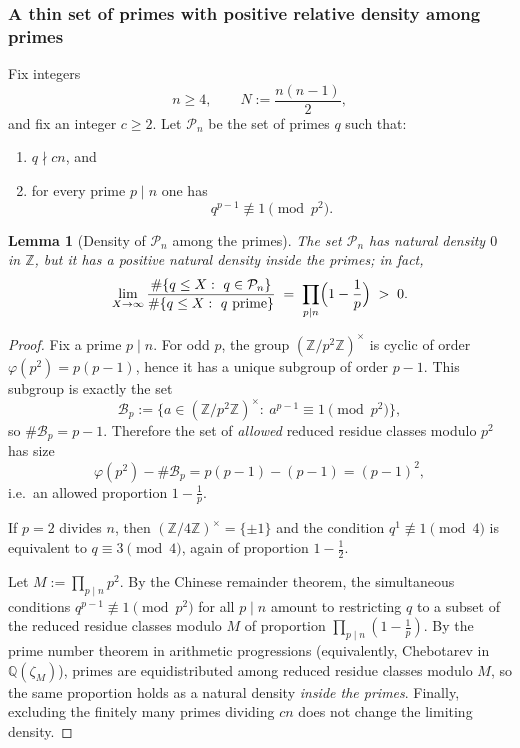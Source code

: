 \documentclass[11pt,letterpaper]{amsart}
\newcommand{\Z}{\mathbb{Z}}
\newcommand{\Q}{\mathbb{Q}}
\theoremstyle{plain}
\newtheorem{lemma}[theorem]{Lemma}
\theoremstyle{definition}
\theoremstyle{remark}
\theoremstyle{plain}
\begin{document}
\subsubsection{A thin set of primes with positive relative density among primes}

Fix integers
\[
n\ge 4,\qquad N:=\frac{n(n-1)}2,
\]
and fix an integer $c\ge 2$.
Let $\mathcal P_n$ be the set of primes $q$ such that:
\begin{enumerate}[label=\textup{(\roman*)}]
\item $q\nmid cn$, and
\item for every prime $p\mid n$ one has
\begin{equation}\label{eq:wieferich-avoid}
q^{p-1}\not\equiv 1\pmod{p^2}.
\end{equation}
\end{enumerate}

\begin{lemma}[Density of $\mathcal P_n$ among the primes]
\label{lem:density-Pm}
The set $\mathcal P_n$ has natural density $0$ in $\Z$, but it has a positive natural density inside the primes; in fact,
\[
\lim_{X\to\infty}\frac{\#\{q\le X:\ q\in\mathcal P_n\}}{\#\{q\le X:\ q\ \text{prime}\}}
\;=\;
\prod_{p\mid n}\Bigl(1-\frac1p\Bigr)
\;>\;0.
\]
\end{lemma}

\begin{proof}
Fix a prime $p\mid n$.  For odd $p$, the group $(\Z/p^2\Z)^\times$ is cyclic of order $\varphi(p^2)=p(p-1)$,
hence it has a unique subgroup of order $p-1$.
This subgroup is exactly the set
\[
\mathcal B_p:=\{a\in (\Z/p^2\Z)^\times:\ a^{p-1}\equiv 1\pmod{p^2}\},
\]
so $\#\mathcal B_p=p-1$. Therefore the set of \emph{allowed} reduced residue classes modulo $p^2$ has size
\[
\varphi(p^2)-\#\mathcal B_p=p(p-1)-(p-1)=(p-1)^2,
\]
i.e.\ an allowed proportion $1-\frac1p$.

If $p=2$ divides $n$, then $(\Z/4\Z)^\times=\{\pm1\}$ and the condition $q^{1}\not\equiv 1\pmod4$
is equivalent to $q\equiv 3\pmod4$, again of proportion $1-\frac12$.

Let $M:=\prod_{p\mid n}p^2$. By the Chinese remainder theorem, the simultaneous conditions
$q^{p-1}\not\equiv 1\pmod{p^2}$ for all $p\mid n$ amount to restricting $q$ to a subset of the reduced residue classes
modulo $M$ of proportion $\prod_{p\mid n}(1-\frac1p)$.
By the prime number theorem in arithmetic progressions (equivalently, Chebotarev in $\Q(\zeta_M)$),
primes are equidistributed among reduced residue classes modulo $M$, so the same proportion holds as a natural density
\emph{inside the primes}.  Finally, excluding the finitely many primes dividing $cn$ does not change the limiting density.
\end{proof}
\end{document}
